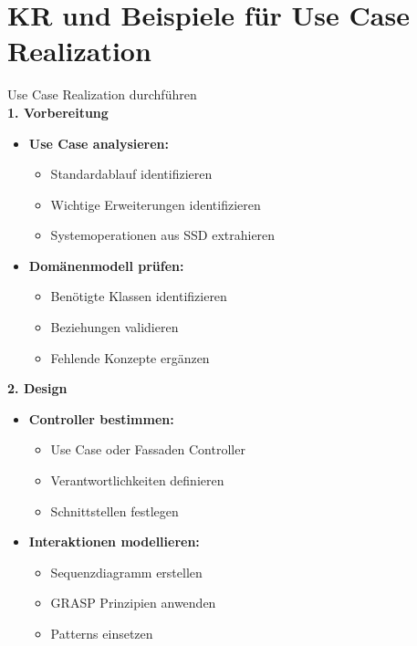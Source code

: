 \section{KR und Beispiele für Use Case Realization}

\begin{KR}{Use Case Realization durchführen}\\
\textbf{1. Vorbereitung}
\begin{itemize}
    \item \textbf{Use Case analysieren:}
    \begin{itemize}
        \item Standardablauf identifizieren
        \item Wichtige Erweiterungen identifizieren
        \item Systemoperationen aus SSD extrahieren
    \end{itemize}
    
    \item \textbf{Domänenmodell prüfen:}
    \begin{itemize}
        \item Benötigte Klassen identifizieren
        \item Beziehungen validieren
        \item Fehlende Konzepte ergänzen
    \end{itemize}
\end{itemize}

\textbf{2. Design}
\begin{itemize}
    \item \textbf{Controller bestimmen:}
    \begin{itemize}
        \item Use Case oder Fassaden Controller
        \item Verantwortlichkeiten definieren
        \item Schnittstellen festlegen
    \end{itemize}
    
    \item \textbf{Interaktionen modellieren:}
    \begin{itemize}
        \item Sequenzdiagramm erstellen
        \item GRASP Prinzipien anwenden
        \item Patterns einsetzen
    \end{itemize}
\end{itemize}


\end{KR}
